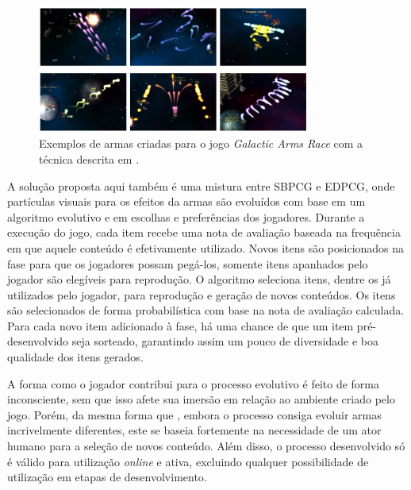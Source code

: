 \begin{figure}[htb]
	\begin{center}
		\includegraphics[width=0.8\textwidth]{Imagens/hastings2009automatic.jpg}
		\caption{Exemplos de armas criadas para o jogo \emph{Galactic Arms Race} com a técnica descrita em \cite{hastings2009evolving}.}
		\label{fig:hastings2009evolving}
	\end{center}
\end{figure}

A solução proposta aqui também é uma mistura entre SBPCG e EDPCG, onde partículas visuais para os efeitos da armas são evoluídos com base em um algoritmo evolutivo e em escolhas e preferências dos jogadores. Durante a execução do jogo, cada item recebe uma nota de avaliação baseada na frequência em que aquele conteúdo é efetivamente utilizado. Novos itens são posicionados na fase para que os jogadores possam pegá-los, somente itens apanhados pelo jogador são elegíveis para reprodução. O algoritmo seleciona itens, dentre os já utilizados pelo jogador, para reprodução e geração de novos conteúdos. Os itens são selecionados de forma probabilística com base na nota de avaliação calculada. Para cada novo item adicionado à fase, há uma chance de que um item pré-desenvolvido seja sorteado, garantindo assim um pouco de diversidade e boa qualidade dos itens gerados.

A forma como o jogador contribui para o processo evolutivo é feito de forma inconsciente, sem que isso afete sua imersão em relação ao ambiente criado pelo jogo. Porém, da mesma forma que \cite{kerssemakers2012procedural}, embora o processo consiga evoluir armas incrivelmente diferentes, este se baseia fortemente na necessidade de um ator humano para a seleção de novos conteúdo. Além disso, o processo desenvolvido só é válido para utilização \emph{online} e ativa, excluindo qualquer possibilidade de utilização em etapas de desenvolvimento.

